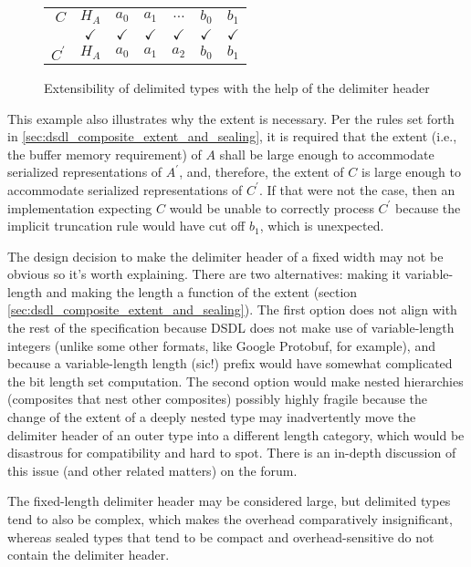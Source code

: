 \begin{remark}
    \begin{figure}[H]
        \centering
        \begin{tabular}{r c c c c c c}
            \cline{2-7}
            $C$ &
            \multicolumn{1}{|c|}{$H_A$} & \multicolumn{1}{c|}{$a_0$} & \multicolumn{1}{c|}{$a_1$}
            &\multicolumn{1}{c|}{\footnotesize{$\ldots$}}
            &\multicolumn{1}{c|}{$b_0$} & \multicolumn{1}{c|}{$b_1$}
            \\\cline{2-7}
            & $\checkmark$ & $\checkmark$ & $\checkmark$ & $\checkmark$ & $\checkmark$ & $\checkmark$ \\
            \cline{2-7}
            $C^\prime$ &
            \multicolumn{1}{|c|}{$H_A$} & \multicolumn{1}{c|}{$a_0$} & \multicolumn{1}{c|}{$a_1$} &
            \multicolumn{1}{c|}{$a_2$}
            &\multicolumn{1}{c|}{$b_0$} & \multicolumn{1}{c|}{$b_1$}
            \\\cline{2-7}
        \end{tabular}
        \caption{Extensibility of delimited types with the help of the delimiter header}
        \label{fig:dsdl_non_sealed_extensibility}
    \end{figure}

    This example also illustrates why the extent is necessary.
    Per the rules set forth in \ref{sec:dsdl_composite_extent_and_sealing},
    it is required that the extent (i.e., the buffer memory requirement) of $A$ shall be large enough to accommodate
    serialized representations of $A^\prime$, and, therefore,
    the extent of $C$ is large enough to accommodate serialized representations of $C^\prime$.
    If that were not the case, then an implementation expecting $C$ would be unable to correctly process $C^\prime$
    because the implicit truncation rule would have cut off $b_1$, which is unexpected.

    The design decision to make the delimiter header of a fixed width may not be obvious so it's worth explaining.
    There are two alternatives: making it variable-length and making the length a function of the extent
    (section \ref{sec:dsdl_composite_extent_and_sealing}).
    The first option does not align with the rest of the specification because DSDL does not make use of
    variable-length integers (unlike some other formats, like Google Protobuf, for example),
    and because a variable-length length {\footnotesize{(sic!)}} prefix would have somewhat complicated the
    bit length set computation.
    The second option would make nested hierarchies (composites that nest other composites) possibly highly fragile
    because the change of the extent of a deeply nested type may inadvertently move the delimiter header of an
    outer type into a different length category, which would be disastrous for compatibility and hard to spot.
    There is an in-depth discussion of this issue (and other related matters) on the forum.

    The fixed-length delimiter header may be considered large,
    but delimited types tend to also be complex, which makes the overhead comparatively insignificant,
    whereas sealed types that tend to be compact and overhead-sensitive do not contain the delimiter header.
\end{remark}

